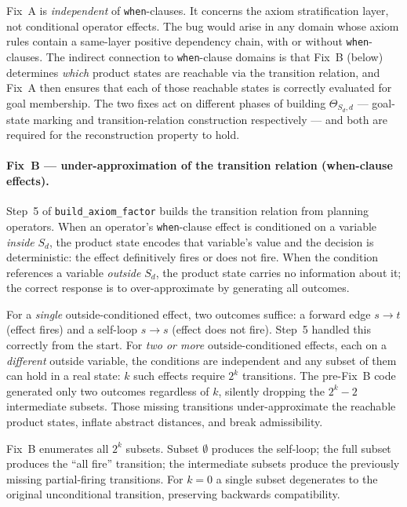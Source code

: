 \documentclass[11pt,a4paper]{article}
\begin{document}
Fix~A is \emph{independent} of \texttt{when}-clauses.  It concerns the
axiom stratification layer, not conditional operator effects.  The bug
would arise in any domain whose axiom rules contain a same-layer positive
dependency chain, with or without \texttt{when}-clauses.  The indirect
connection to \texttt{when}-clause domains is that Fix~B (below) determines
\emph{which} product states are reachable via the transition relation, and
Fix~A then ensures that each of those reachable states is correctly
evaluated for goal membership.  The two fixes act on different phases of
building $\Theta_{S_d,d}$ --- goal-state marking and transition-relation
construction respectively --- and both are required for the reconstruction
property to hold.

\paragraph{Fix~B --- under-approximation of the transition relation (when-clause
effects).}

Step~5 of \texttt{build\_axiom\_factor} builds the transition relation
from planning operators.  When an operator's \texttt{when}-clause effect
is conditioned on a variable \emph{inside} $S_d$, the product state
encodes that variable's value and the decision is deterministic: the
effect definitively fires or does not fire.  When the condition references
a variable \emph{outside} $S_d$, the product state carries no information
about it; the correct response is to over-approximate by generating all
outcomes.

For a \emph{single} outside-conditioned effect, two outcomes suffice:
a forward edge $s \to t$ (effect fires) and a self-loop $s \to s$
(effect does not fire).  Step~5 handled this correctly from the start.
For \emph{two or more} outside-conditioned effects, each on a
\emph{different} outside variable, the conditions are independent and
any subset of them can hold in a real state: $k$ such effects require
$2^k$ transitions.  The pre-Fix~B code generated only two outcomes
regardless of $k$, silently dropping the $2^k - 2$ intermediate subsets.
Those missing transitions under-approximate the reachable product states,
inflate abstract distances, and break admissibility.

Fix~B enumerates all $2^k$ subsets.  Subset $\emptyset$ produces the
self-loop; the full subset produces the ``all fire'' transition; the
intermediate subsets produce the previously missing partial-firing
transitions.  For $k = 0$ a single subset degenerates to the original
unconditional transition, preserving backwards compatibility.
\end{document}
